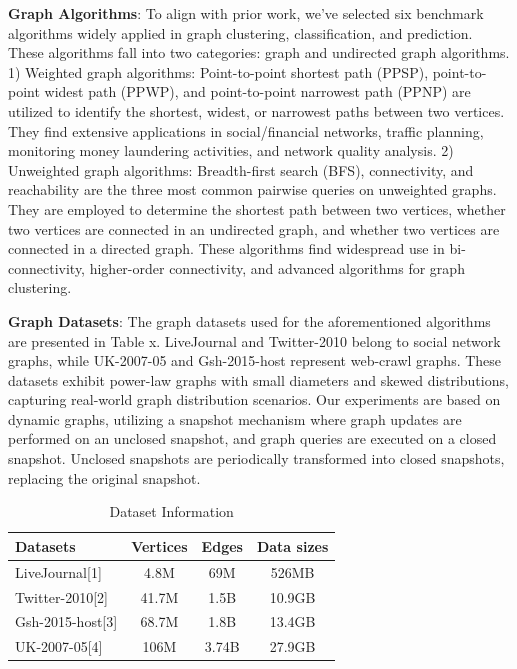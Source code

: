 \documentclass[lettersize,journal]{IEEEtran} %
\begin{document}
{\bf{Graph Algorithms}}: To align with prior work\cite{sgraph}\cite{tripoline}\cite{pnp}\cite{glign}, we've selected six benchmark algorithms widely applied in graph clustering, classification, and prediction. These algorithms fall into two categories: graph and undirected graph algorithms. 1) Weighted graph algorithms: Point-to-point shortest path (PPSP)\cite{ppsp_1}\cite{ppsp_2}\cite{ppsp_3}, point-to-point widest path (PPWP)\cite{ppwp}, and point-to-point narrowest path (PPNP)\cite{ppnp} are utilized to identify the shortest, widest, or narrowest paths between two vertices. They find extensive applications in social/financial networks, traffic planning, monitoring money laundering activities, and network quality analysis. 2) Unweighted graph algorithms: Breadth-first search (BFS)\cite{bfs}, connectivity\cite{reachability_1}\cite{reachability_2}\cite{reachability_3}, and reachability\cite{connectivity} are the three most common pairwise queries on unweighted graphs. They are employed to determine the shortest path between two vertices, whether two vertices are connected in an undirected graph, and whether two vertices are connected in a directed graph. These algorithms find widespread use in bi-connectivity, higher-order connectivity, and advanced algorithms for graph clustering.

{\bf{Graph Datasets}}: The graph datasets used for the aforementioned algorithms are presented in Table x. LiveJournal and Twitter-2010 belong to social network graphs, while UK-2007-05 and Gsh-2015-host represent web-crawl graphs. These datasets exhibit power-law graphs with small diameters and skewed distributions, capturing real-world graph distribution scenarios. Our experiments are based on dynamic graphs, utilizing a snapshot mechanism where graph updates are performed on an unclosed snapshot, and graph queries are executed on a closed snapshot. Unclosed snapshots are periodically transformed into closed snapshots, replacing the original snapshot.

\begin{table}[h]
    \centering
    \begin{tabular}{lccc}
    \hline
    Datasets          & Vertices & Edges  & Data sizes \\
    \hline
    LiveJournal[1]    & 4.8M     & 69M    & 526MB      \\
    Twitter-2010[2]   & 41.7M    & 1.5B   & 10.9GB     \\
    Gsh-2015-host[3]  & 68.7M    & 1.8B   & 13.4GB     \\
    UK-2007-05[4]     & 106M     & 3.74B  & 27.9GB     \\
    \hline
    \end{tabular}
    \caption{Dataset Information}
    \end{table}
\end{document}
